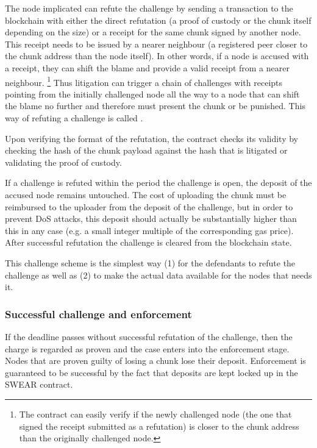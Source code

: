 The node implicated can refute the challenge by sending a transaction to the blockchain with either the direct refutation (a proof of custody or the chunk itself depending on the size) or a receipt for the same chunk signed by another node. This receipt needs to be issued by a nearer neighbour (a registered peer closer to the chunk address than the node itself). In other words, if a node is accused with a receipt, they can  shift the blame and provide a valid receipt from a nearer neighbour.%
%
\footnote{The contract can easily verify if the newly challenged node (the one that signed the receipt submitted as a refutation) is closer to the chunk address than the originally challenged node.}
%
Thus litigation can trigger a chain of challenges with receipts pointing from the initially challenged node all the way to a node that can shift the blame no further and therefore must present the chunk or be punished. This way of refuting a challenge is called . 

Upon verifying the format of the refutation, the contract checks its validity by checking the hash of the chunk payload against the hash that is litigated or validating the proof of custody. 

If a challenge is refuted within the period the challenge is open, the deposit of the accused node remains untouched. The cost of uploading the chunk must be reimbursed to the uploader from the deposit of the challenge, but in order to prevent DoS attacks, this deposit should actually be substantially higher than this in any case (e.g. a small integer multiple of the corresponding gas price). After successful refutation the challenge is cleared from the blockchain state.

This challenge scheme is the simplest way (1) for the defendants to refute the challenge as well as (2) to make the actual data available for the nodes that needs it.

\subsubsection{Successful challenge and enforcement}

If the deadline passes without successful refutation of the challenge, then the charge is regarded as proven and the case enters into the enforcement stage. Nodes that are proven guilty of losing a chunk lose their deposit. Enforcement is guaranteed to be successful by the fact that deposits are kept locked up in the SWEAR contract.

